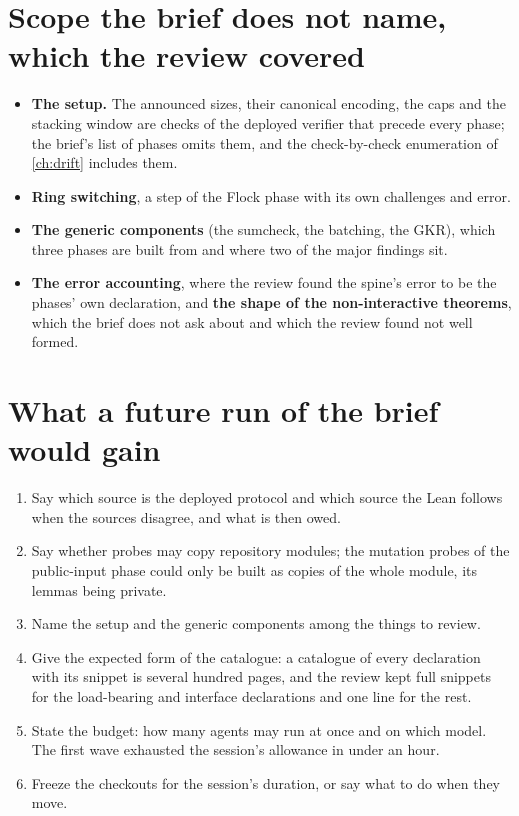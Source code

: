 \section{Scope the brief does not name, which the review covered}

\begin{itemize}
\item \textbf{The setup.} The announced sizes, their canonical encoding, the caps and the
  stacking window are checks of the deployed verifier that precede every phase; the brief's
  list of phases omits them, and the check-by-check enumeration of \cref{ch:drift} includes
  them.
\item \textbf{Ring switching}, a step of the Flock phase with its own challenges and error.
\item \textbf{The generic components} (the sumcheck, the batching, the GKR), which three
  phases are built from and where two of the major findings sit.
\item \textbf{The error accounting}, where the review found the spine's error to be the
  phases' own declaration, and \textbf{the shape of the non-interactive theorems}, which the
  brief does not ask about and which the review found not well formed.
\end{itemize}

\section{What a future run of the brief would gain}

\begin{enumerate}
\item Say which source is the deployed protocol and which source the Lean follows when the
  sources disagree, and what is then owed.
\item Say whether probes may copy repository modules; the mutation probes of the public-input
  phase could only be built as copies of the whole module, its lemmas being private.
\item Name the setup and the generic components among the things to review.
\item Give the expected form of the catalogue: a catalogue of every declaration with its
  snippet is several hundred pages, and the review kept full snippets for the load-bearing and
  interface declarations and one line for the rest.
\item State the budget: how many agents may run at once and on which model. The first wave
  exhausted the session's allowance in under an hour.
\item Freeze the checkouts for the session's duration, or say what to do when they move.
\end{enumerate}
